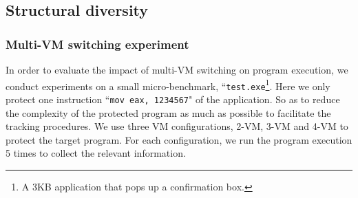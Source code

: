 \documentclass[preprint,12pt,3p]{elsarticle}
\begin{document}
\subsection{Structural diversity}\label{sec:s-d}
\subsubsection{Multi-VM switching experiment}
In order to evaluate the impact of multi-VM switching on program execution, we conduct experiments on
a small micro-benchmark, ``\texttt{test.exe}\footnote{A 3KB application that pops up a confirmation box.}. Here we only protect one instruction ``\texttt{mov eax, 1234567}" of the application.
So as to reduce the complexity of the protected program as much as possible to facilitate the tracking procedures.
We use three VM configurations, 2-VM, 3-VM and 4-VM to protect the target program.
For each configuration, we run the program execution 5 times to collect the relevant information.
\end{document}
